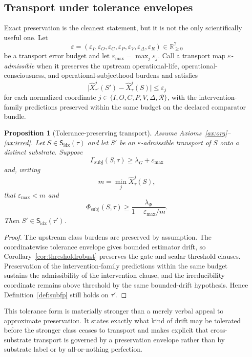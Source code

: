 \documentclass[11pt,a4paper]{article}
\newtheorem{proposition}[theorem]{Proposition}
\theoremstyle{definition}
\newcommand{\Subfp}{\mathsf{S}_{\mathrm{idx}}}
\newcommand{\SelfIndex}{I}
\newcommand{\OwnField}{O}
\newcommand{\ContField}{C}
\newcommand{\Persp}{P}
\newcommand{\ValAsym}{V}
\newcommand{\IntervProf}{\Delta}
\newcommand{\Irred}{\mathcal{R}}
\newcommand{\GateSubj}{\Gamma_{\mathrm{subj}}}
\newcommand{\PhiSubj}{\Phi_{\mathrm{subj}}}
\begin{document}
\subsection{Transport under tolerance envelopes}
Exact preservation is the cleanest statement, but it is not the only scientifically useful one. Let
\[
\varepsilon=(\varepsilon_I,\varepsilon_O,\varepsilon_C,\varepsilon_P,\varepsilon_V,\varepsilon_\Delta,\varepsilon_R)
\in \mathbb{R}_{\ge 0}^7
\]
be a transport error budget and let $\varepsilon_{\max}=\max_j \varepsilon_j$. Call a transport map \emph{$\varepsilon$-admissible} when it preserves the upstream operational-life, operational-consciousness, and operational-subjecthood burdens and satisfies
\[
\big|
\widehat{X}_{\tau'}^j(S')-\widehat{X}_{\tau}^j(S)
\big|
\le \varepsilon_j
\]
for each normalized coordinate $j\in\{\SelfIndex,\OwnField,\ContField,\Persp,\ValAsym,\IntervProf,\Irred\}$, with the intervention-family predictions preserved within the same budget on the declared comparator bundle.

\begin{proposition}[Tolerance-preserving transport]
Assume Axioms~\ref{ax:org}--\ref{ax:irred}. Let $S\in \Subfp(\tau)$ and let $S'$ be an $\varepsilon$-admissible transport of $S$ onto a distinct substrate. Suppose
\[
\GateSubj(S,\tau)\ge \lambda_G+\varepsilon_{\max}
\]
and, writing
\[
m=\min_j \widehat{X}_\tau^j(S),
\]
that $\varepsilon_{\max}<m$ and
\[
\PhiSubj(S,\tau)\ge \frac{\lambda_\Phi}{1-\varepsilon_{\max}/m}.
\]
Then $S'\in \Subfp(\tau')$.
\end{proposition}

\begin{proof}
The upstream class burdens are preserved by assumption. The coordinatewise tolerance envelope gives bounded estimator drift, so Corollary~\ref{cor:thresholdrobust} preserves the gate and scalar threshold clauses. Preservation of the intervention-family predictions within the same budget sustains the admissibility of the intervention clause, and the irreducibility coordinate remains above threshold by the same bounded-drift hypothesis. Hence Definition~\ref{def:subfp} still holds on $\tau'$.
\end{proof}

This tolerance form is materially stronger than a merely verbal appeal to approximate preservation. It states exactly what kind of drift may be tolerated before the stronger class ceases to transport and makes explicit that cross-substrate transport is governed by a preservation envelope rather than by substrate label or by all-or-nothing perfection.
\end{document}
